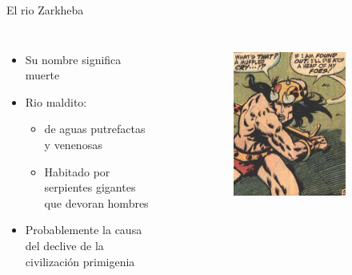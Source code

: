\begin{frame}{El rio Zarkheba}
	\begin{columns}
		\begin{itemize}
			\item Su nombre significa muerte
			\item Rio maldito:
			\begin{itemize}
				\item de aguas putrefactas y venenosas
				\item Habitado por serpientes gigantes que devoran hombres
			\end{itemize}
			\item Probablemente la causa del declive de la civilización primigenia
		\end{itemize}
		\begin{figure}[htp]
			\centering
			\begin{subfigure}[b]{0.3\textwidth}
				\includegraphics[width=\textwidth]{img/conan/CTB}
			\end{subfigure}

\end{figure}
\end{columns}
\end{frame}
